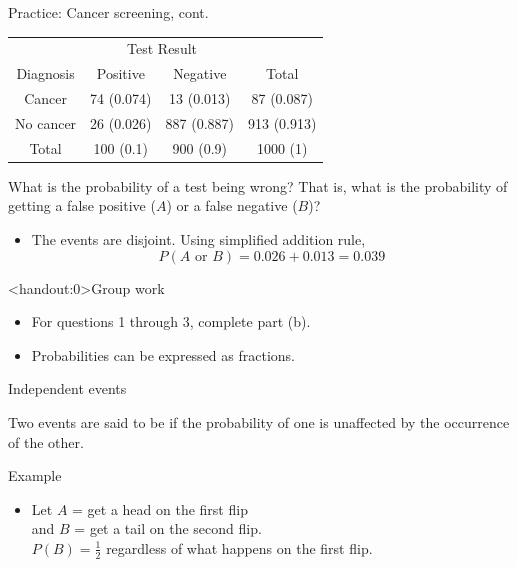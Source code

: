 \documentclass[xcolor=table]{beamer}
\begin{document}
\begin{frame}{Practice: Cancer screening, cont.}
\begin{block}{}
{\centering
\begin{tabular}{c | c  c | c}
\multicolumn{1}{c}{} & \multicolumn{2}{c}{Test Result}\\
Diagnosis & Positive & Negative & Total \\
\hline
Cancer & 74 (0.074) & 13 (0.013) & 87 (0.087)\\
No cancer & 26 (0.026) & 887 (0.887) & 913 (0.913)\\
\hline
Total & 100 (0.1) & 900 (0.9) & 1000 (1)
\end{tabular}\par
}
\end{block}

\begin{exampleblock}{}
What is the probability of a test being wrong? That is, what is the probability of getting a false positive ($A$) or a false negative ($B$)?

\begin{itemize}
\pause
\item The events are disjoint. Using simplified addition rule,
\[ P(A \text{ or } B) = 0.026 + 0.013 = 0.039\]
\end{itemize}
\end{exampleblock}
\end{frame}

\begin{frame}<handout:0>{Group work}
\begin{block}{}
\large
\begin{itemize}
\item For questions 1 through 3, complete part (b).
\item Probabilities can be expressed as fractions.
\end{itemize}
\end{block}
\end{frame}


\begin{frame}{Independent events}
\begin{block}{}
\large Two events are said to be  if the probability of one is unaffected by the occurrence of the other.
\end{block}

\pause

\begin{exampleblock}{Example}
\begin{itemize}
\item Let $A$ = get a head on the first flip\\
and $B$ = get a tail on the second flip.\\
$P(B) = \frac 1 2$ regardless of what happens on the first flip.
\end{itemize}
\end{exampleblock}
\end{frame}
\end{document}
